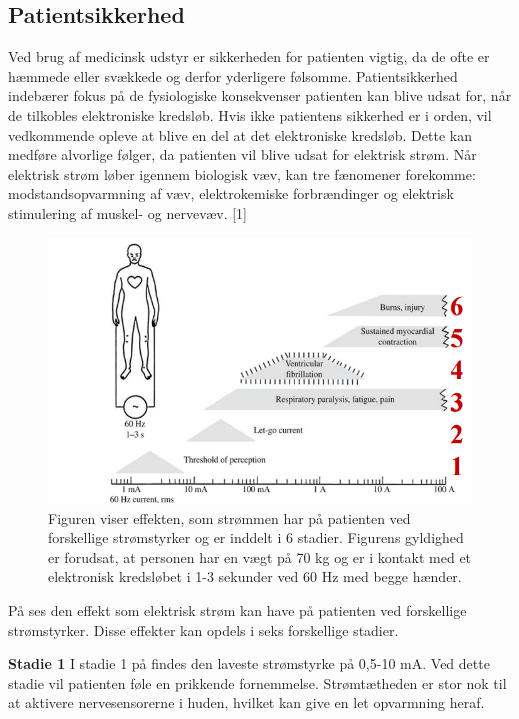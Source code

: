 \subsection{Patientsikkerhed}
Ved brug af medicinsk udstyr er sikkerheden for patienten vigtig, da de ofte er hæmmede eller svækkede og derfor yderligere følsomme. Patientsikkerhed indebærer fokus på de fysiologiske konsekvenser patienten kan blive udsat for, når de tilkobles elektroniske kredsløb. Hvis ikke patientens sikkerhed er i orden, vil vedkommende opleve at blive en del at det elektroniske kredsløb. Dette kan medføre alvorlige følger, da patienten vil blive udsat for elektrisk strøm. Når elektrisk strøm løber igennem biologisk væv, kan tre fænomener forekomme: modstandsopvarmning af væv, elektrokemiske forbrændinger og elektrisk stimulering af muskel- og nervevæv. [1] 
\begin{figure}[H]
	\centering
	\includegraphics[scale=0.5]{figures/bProblemanalyse/Patientsikkerhed.png}
	\caption{Figuren viser effekten, som strømmen har på patienten ved forskellige strømstyrker og er inddelt i 6 stadier. Figurens gyldighed er forudsat, at personen har en vægt på 70 kg og er i kontakt med et elektronisk kredsløbet i 1-3 sekunder ved 60 Hz med begge hænder. }
	\label{Patientsikkerhed}
\end{figure}

På  ses den effekt som elektrisk strøm kan have på patienten ved forskellige strømstyrker. Disse effekter kan opdels i seks forskellige stadier.

\textbf{Stadie 1}
 I stadie 1 på  findes den laveste strømstyrke på 0,5-10 mA. Ved dette stadie vil patienten føle en prikkende fornemmelse. Strømtætheden er stor nok til at aktivere nervesensorerne i huden, hvilket kan give en let opvarmning heraf. 

